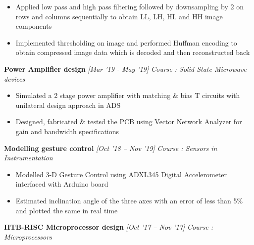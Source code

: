\documentclass[10 pt]{article}%
\begin{document}
{{{{\begin{itemize}[leftmargin=*]
\item Applied low pass and high pass filtering followed by downsampling by 2 on rows and columns sequentially to obtain LL, LH, HL and HH image components
\item Implemented thresholding on image and performed Huffman encoding to obtain compressed image data which is decoded and then reconstructed back
	\end{itemize}
{\flushleft \textbf {\large{Power Amplifier design}} \hfill {{{\em{[Mar '19 - May '19]}}}}
	\vspace{-0.8em}
	{\flushleft \em{Course : Solid State Microwave devices}}
	\vspace{-5pt}
	\begin{itemize}[leftmargin=*]
		\setlength\itemsep{1.5pt}
		\setlength\parskip{1.5pt}
		\item Simulated a 2 stage power amplifier with matching \& bias T circuits with unilateral design approach in ADS
		\item Designed, fabricated \& testsd the PCB using Vector Network Analyzer for gain and bandwidth specifications
	\end{itemize}
{\flushleft \textbf {\large{Modelling gesture control}} \hfill {{{\em{[Oct '18 – Nov '19]}}}}
	\vspace{-0.8em}
	{\flushleft \em{Course : Sensors in Instrumentation}}
	\vspace{-5pt}
	\begin{itemize}[leftmargin=*]
		\setlength\itemsep{1.5pt}
\setlength\parskip{1.5pt}
		\item Modelled 3-D Gesture Control using ADXL345 Digital Accelerometer interfaced with Arduino board
		\item Estimated inclination angle of the three axes with an error of less than 5\% and plotted the same in real time
	\end{itemize}
{\flushleft \textbf {\large{IITB-RISC Microprocessor design}} \hfill {{{\em{[Oct '17 – Nov '17]}}}}
	\vspace{-0.8em}
	{\flushleft \em{Course : Microprocessors}}
	\vspace{-5pt}
	\begin{itemize}[leftmargin=*]
		\setlength\itemsep{1.5pt}

\end{itemize}}}}}}}}
\end{document}
